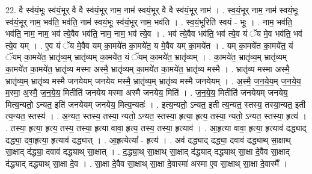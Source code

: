 \documentclass[17pt]{extarticle}
\begin{document}
22. वै स्व॑यं॒भूः स्व॑यं॒भूर् वै वै स्व॑यं॒भूर् नाम॒ नाम॑ स्वयं॒भूर् वै वै स्व॑यं॒भूर् नाम॑ । . स्व॒यं॒भूर् नाम॒ नाम॑ स्वयं॒भूः स्व॑यं॒भूर् नाम॒ भव॑ति॒ भव॑ति॒ नाम॑ स्वयं॒भूः स्व॑यं॒भूर् नाम॒ भव॑ति । . स्व॒यं॒भूरिति॑ स्वयं - भूः । . नाम॒ भव॑ति॒ भव॑ति॒ नाम॒ नाम॒ भव॑ त्ये॒वैव भव॑ति॒ नाम॒ नाम॒ भव॑ त्ये॒व । . भव॑ त्ये॒वैव भव॑ति॒ भव॑ त्ये॒व यं ॅय मे॒व भव॑ति॒ भव॑ त्ये॒व यम् । . ए॒व यं ॅय मे॒वैव यम् का॒मये॑त का॒मये॑त॒ य मे॒वैव यम् का॒मये॑त । . यम् का॒मये॑त का॒मये॑त॒ यं ॅयम् का॒मये॑त॒ भ्रातृ॑व्य॒म् भ्रातृ॑व्यम् का॒मये॑त॒ यं ॅयम् का॒मये॑त॒ भ्रातृ॑व्यम् । . का॒मये॑त॒ भ्रातृ॑व्य॒म् भ्रातृ॑व्यम् का॒मये॑त का॒मये॑त॒ भ्रातृ॑व्य मस्मा अस्मै॒ भ्रातृ॑व्यम् का॒मये॑त का॒मये॑त॒ भ्रातृ॑व्य मस्मै । . भ्रातृ॑व्य मस्मा अस्मै॒ भ्रातृ॑व्य॒म् भ्रातृ॑व्य मस्मै जनयेयम् जनयेय मस्मै॒ भ्रातृ॑व्य॒म् भ्रातृ॑व्य मस्मै जनयेयम् । . अ॒स्मै॒ ज॒न॒ये॒य॒म् ज॒न॒ये॒य॒ म॒स्मा॒ अ॒स्मै॒ ज॒न॒ये॒य॒ मितीति॑ जनयेय मस्मा अस्मै जनयेय॒ मिति॑ । . ज॒न॒ये॒य॒ मितीति॑ जनयेयम् जनयेय॒ मित्य॒न्यतो॒ ऽन्यत॒ इति॑ जनयेयम् जनयेय॒ मित्य॒न्यतः॑ । . इत्य॒न्यतो॒ ऽन्यत॒ इती त्य॒न्यत॒ स्तस्य॒ तस्या॒न्यत॒ इती त्य॒न्यत॒ स्तस्य॑ । . अ॒न्यत॒ स्तस्य॒ तस्या॒ न्यतो॒ ऽन्यत॒ स्तस्या॒ हृत्या॒ हृत्य॒ तस्या॒ न्यतो॒ ऽन्यत॒ स्तस्या॒ हृत्य॑ । . तस्या॒ हृत्या॒ हृत्य॒ तस्य॒ तस्या॒ हृत्या वावा॒ हृत्य॒ तस्य॒ तस्या॒ हृत्याव॑ । . आ॒हृत्या वावा॒ हृत्या॒ हृत्याव॑ दद्ध्याद् दद्ध्या॒ दवा॒हृत्या॒ हृत्याव॑ दद्ध्यात् । . आ॒हृत्येत्या᳚ - हृत्य॑ । . अव॑ दद्ध्याद् दद्ध्या॒ दवाव॑ दद्ध्याथ् सा॒क्षाथ् सा॒क्षाद् द॑द्ध्या॒ दवाव॑ दद्ध्याथ् सा॒क्षात् । . द॒द्ध्या॒थ् सा॒क्षाथ् सा॒क्षाद् द॑द्ध्याद् दद्ध्याथ् सा॒क्षा दे॒वैव सा॒क्षाद् द॑द्ध्याद् दद्ध्याथ् सा॒क्षा दे॒व । . सा॒क्षा दे॒वैव सा॒क्षाथ् सा॒क्षा दे॒वास्मा॑ अस्मा ए॒व सा॒क्षाथ् सा॒क्षा दे॒वास्मै᳚ । \newline
\end{document}
